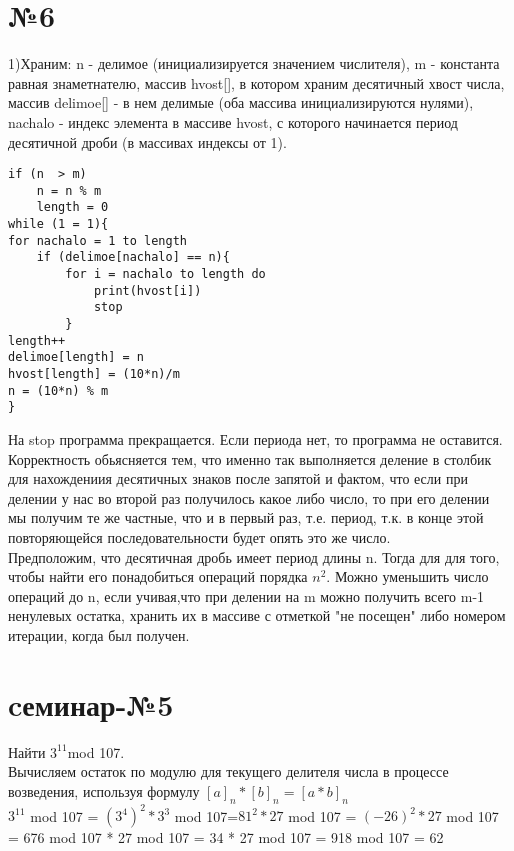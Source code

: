 \documentclass[a4paper,12pt]{article} %
\begin{document}
\section*{№6}
1)Храним: n - делимое (инициализируется значением числителя), m - константа равная знаметнателю, массив hvost[], в котором храним десятичный хвост числа, массив delimoe[] - в нем делимые (оба массива инициализируются нулями), nachalo - индекс элемента в массиве hvost, с которого начинается период десятичной  дроби (в массивах индексы от 1).
\begin{lstlisting}
if (n  > m)
	n = n % m
	length = 0
while (1 = 1){
for nachalo = 1 to length 
	if (delimoe[nachalo] == n){
		for i = nachalo to length do 
			print(hvost[i])
			stop
		}
length++
delimoe[length] = n
hvost[length] = (10*n)/m
n = (10*n) % m
}	
\end{lstlisting}
На stop программа прекращается. Если периода нет, то программа  не оставится.
Корректность обьясняется тем, что именно так выполняется деление в столбик для нахождениия десятичных знаков после запятой и фактом, что если при делении у нас во второй раз получилось какое либо число, то при его делении мы получим те же частные, что и в первый раз, т.е. период, т.к. в конце этой повторяющейся последовательности будет опять это же число.\\
Предположим, что десятичная дробь имеет период длины n. Тогда для для того, чтобы найти его понадобиться операций порядка $n^{2}$. Можно уменьшить число операций до n, если учивая,что при делении на m можно получить всего m-1  ненулевых остатка, хранить их в массиве с отметкой "не посещен" либо номером итерации, когда был получен.
\section*{cеминар-№5}
Найти $ 3^{11} $mod 107.\\
Вычисляем остаток по модулю для текущего делителя числа в процессе возведения, используя формулу $[a]_{n} * [b]_{n}=[a*b]_{n}$\\
$ 3^{11}$ mod 107 = $(3^{4})^{2}*3^{3}$ mod 107=$81^{2}*27$ mod 107 = $(-26)^{2}*27$ mod 107 = 676 mod 107 * 27 mod 107 = 34 * 27 mod 107 = 918 mod 107 = 62 \\
\end{document}
